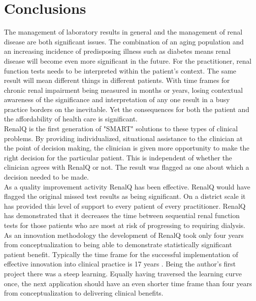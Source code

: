 \documentclass[11pt]{article}
\begin{document}
\section{Conclusions}
The management of laboratory results in general and the management of renal disease are both significant issues. The combination of an aging population and an increasing incidence of predisposing illness such as diabetes means renal disease will become even more significant in the future. For the practitioner, renal function tests needs to be interpreted within the patient's context. The same result will mean different things in different patients. With time frames for chronic renal impairment being measured in months or years, losing contextual awareness of the significance and interpretation of any one result in a busy practice borders on the inevitable. Yet the consequences for both the patient and the affordability of health care is significant.\\

RenalQ is the first generation of "SMART" solutions to these types of clinical problems. By providing individualized, situational assistance to the clinician at the point of decision making, the clinician is given more opportunity to make the right decision for the particular patient. This is independent of whether the clinician agrees with RenalQ or not. The result was flagged as one about which a decision needed to be made.\\ 

As a quality improvement activity RenalQ has been effective. RenalQ would have flagged the original missed test results as being significant. On a district scale it has provided this level of support to every patient of every practitioner. RenalQ has demonstrated that it decreases the time between sequential renal function tests for those patients who are most at risk of progressing to requiring dialysis. \\

As an innovation methodology the development of RenalQ took only four years from conceptualization to being able to demonstrate statistically significant patient benefit. Typically the time frame for the successful implementation of effective innovation into clinical practice is 17 years \citep{morris2011answer}. Being the author's first project there was a steep learning. Equally having traversed the learning curve once, the next application should have an even shorter time frame than four years from conceptualization to delivering clinical benefits. \\
\end{document}

